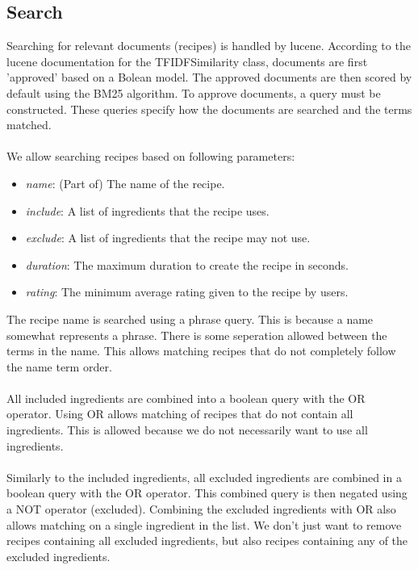 \documentclass{article}
\begin{document}
\subsection{Search}

Searching for relevant documents (recipes) is handled by lucene.
According to the lucene documentation for the TFIDFSimilarity class,
documents are first 'approved' based on a Bolean model.
The approved documents are then scored by default using the BM25 algorithm.
To approve documents, a query must be constructed.
These queries specify how the documents are searched and the terms matched.
\\~\\
We allow searching recipes based on following parameters:
\begin{itemize}
    \item \textit{name}: (Part of) The name of the recipe.
    \item \textit{include}: A list of ingredients that the recipe uses.
    \item \textit{exclude}: A list of ingredients that the recipe may not use.
    \item \textit{duration}: The maximum duration to create the recipe in seconds.
    \item \textit{rating}: The minimum average rating given to the recipe by users.
\end{itemize}
The recipe name is searched using a phrase query.
This is because a name somewhat represents a phrase.
There is some seperation allowed between the terms in the name.
This allows matching recipes that do not completely follow the name term order.
\\~\\
All included ingredients are combined into a boolean query with the OR operator.
Using OR allows matching of recipes that do not contain all ingredients.
This is allowed because we do not necessarily want to use all ingredients.
\\~\\
Similarly to the included ingredients, all excluded ingredients are combined in
a boolean query with the OR operator.
This combined query is then negated using a NOT operator (excluded).
Combining the excluded ingredients with OR also allows matching on a single
ingredient in the list.
We don't just want to remove recipes containing all excluded ingredients,
but also recipes containing any of the excluded ingredients.
\\~\\
\end{document}
